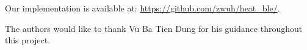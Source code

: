 \documentclass[conference,a4paper]{../../sty/IEEEtran}
\begin{document}
Our implementation is available at: \url{https://github.com/zwuh/heat_ble/}.

The authors would like to thank Vu Ba Tien Dung for his guidance throughout this project.





\nocite*{}


\end{document}
